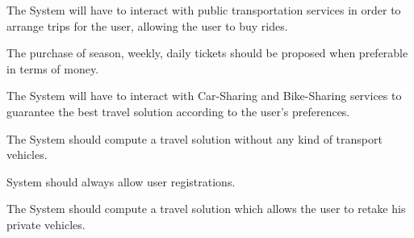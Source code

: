 \begin{goalList}
\item \label{goal:buyTicket}The System will have to interact with public transportation services in order to arrange trips for the user, allowing the user to buy rides.

\begin{enumerate}[label={[}G 5.\arabic*{]}]
\item \label{goal:purchase} The purchase of season, weekly, daily tickets should be proposed when preferable in terms of money.  

\end{enumerate}

\item \label{goal:sharing}The System will have to interact with Car-Sharing and Bike-Sharing services to guarantee the best travel solution according to the user's preferences.

\item \label{goal:piotti}The System should compute a travel solution without any kind of transport vehicles.

\item \label{goal:login} System should always allow user registrations.

\item \label{goal:retakeCar}The System should compute a travel solution which allows the user to retake his private vehicles.

\end{goalList}

